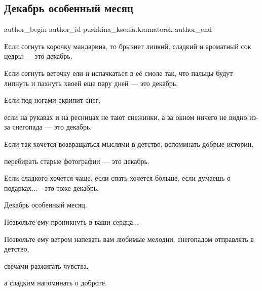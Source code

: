  
 
 
 
 
 
\subsection{Декабрь особенный месяц}
\label{sec:04_12_2021.fb.pushkina_ksenia.kramatorsk.1.dekabrj}
 
\ifcmt
 author_begin
   author_id pushkina_ksenia.kramatorsk
 author_end
\fi

Если согнуть корочку мандарина, то брызнет липкий, сладкий и ароматный сок
цедры — это декабрь.


Если согнуть веточку ели и испачкаться в её смоле так, что пальцы будут липнуть
и пахнуть хвоей еще пару дней — это декабрь.

Если под ногами скрипит снег,

если на рукавах и на ресницах не тают снежинки, а за окном ничего не видно
из-за снегопада — это декабрь.

Если так хочется возвращаться мыслями в детство, вспоминать добрые истории,

перебирать старые фотографии — это декабрь.

Если сладкого хочется чаще, если спать хочется больше, если думаешь о
подарках... - это тоже декабрь.

Декабрь особенный месяц.

Позвольте ему проникнуть в ваши сердца...

Позвольте ему ветром напевать вам любимые мелодии, снегопадом отправлять в
детство,

свечами разжигать чувства,

а сладким напоминать о доброте.
